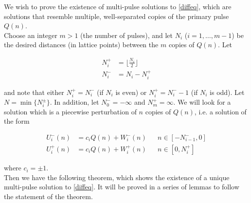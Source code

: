 \documentclass[12pt]{article}
\begin{document}
We wish to prove the existence of multi-pulse solutions to \eqref{diffeq}, which are solutions that resemble multiple, well-separated copies of the primary pulse $Q(n)$.\\

Choose an integer $m > 1$ (the number of pulses), and let $N_i$ ($i = 1, \dots, m-1$) be the desired distances (in lattice points) between the $m$ copies of $Q(n)$. Let 

\begin{align*}
N_i^+ &= \lfloor \frac{N_i}{2} \rfloor \\
N_i^- &= N_i - N_i^+
\end{align*}

and note that either $N_i^+ = N_i^-$ (if $N_i$ is even) or $N_i^+ = N_i^- - 1$ (if $N_i$ is odd). Let $N = \min\{ N_i^\pm \}$. In addition, let $N_0^- = -\infty$ and $N_m^+ = \infty$. We will look for a solution which is a piecewise perturbation of $n$ copies of $Q(n)$, i.e. a solution of the form

\begin{align*}
U_i^-(n) &= c_i Q(n) + W_i^-(n) && n \in [-N_{i-1}^-, 0] \\
U_i^+(n) &= c_i Q(n) + W_i^+(n) && n \in [0, N_i^+]
\end{align*}

where $c_i = \pm 1$. \\

Then we have the following theorem, which shows the existence of a unique multi-pulse solution to \eqref{diffeq}. It will be proved in a series of lemmas to follow the statement of the theorem.
\end{document}
